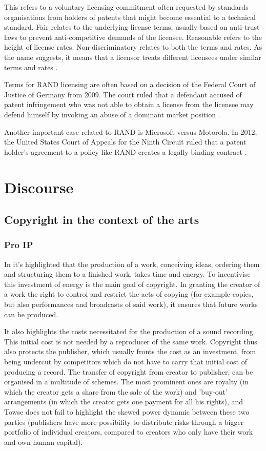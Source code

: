 \documentclass[a4paper]{report}
\begin{document}
This refers to a voluntary licensing commitment often requested by standards organisations from holders of patents that might become essential to a technical standard. Fair relates to the underlying license terms, usually based on anti-trust laws to prevent anti-competitive demands of the licensee. Reasonable refers to the height of license rates. Non-discriminatory relates to both the terms and rates. As the name suggests, it means that a licensor treats different licensees under similar terms and rates \parencite{WikiRAND}. 

Terms for RAND licensing are often based on a decision of the Federal Court of Justice of Germany from 2009. The court ruled that a defendant accused of patent infringement who was not able to obtain a license from the licensee may defend himself by invoking an abuse of a dominant market position \parencite{OrangeBook}.
 
Another important case related to RAND is Microsoft versus Motorola. In 2012, the United States Court of Appeals for the Ninth Circuit ruled that a patent holder's agreement to a policy like RAND creates a legally binding contract \parencite{MicrosoftVsMotorola}.

\chapter{Discourse}
\label{ch:Disc}

\section{Copyright in the context of the arts}
\label{sec:CopyArts}

\subsection{Pro IP}
In \cite{Towse1999} it's highlighted that the production of a work, conceiving ideas, ordering them and structuring them to a finished work, takes time and energy. To incentivise this investment of energy is the main goal of copyright. In granting the creator of a work the right to control and restrict the acts of copying (for example copies, but also performances and broadcasts of said work), it ensures that future works can be produced.

It also highlights the costs necessitated for the production of a sound recording. This initial cost is not needed by a reproducer of the same work. Copyright thus also protects the publisher, which usually fronts the cost as an investment, from being undercut by competitors which do not have to carry that initial cost of producing a record. The transfer of copyright from creator to publisher, can be organised in a multitude of schemes. The most prominent ones are royalty (in which the creator gets a share from the sale of the work) and 'buy-out' arrangements (in which the creator gets one payment for all his rights), and Towse does not fail to highlight the skewed power dynamic between these two parties (publishers have more possibility to distribute risks through a bigger portfolio of individual creators, compared to creators who only have their work and own human capital).
\end{document}
